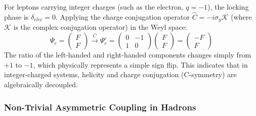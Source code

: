 \documentclass[12pt, a4paper]{article}
\begin{document}
For leptons carrying integer charges (such as the electron, $q = -1$), the locking phase is $\delta_{elec} = 0$. Applying the charge conjugation operator $\hat{C} = -i\sigma_y \mathcal{K}$ (where $\mathcal{K}$ is the complex conjugation operator) in the Weyl space:
\begin{equation}
\Psi_e = \begin{pmatrix} F \\ F \end{pmatrix} \xrightarrow{\hat{C}} \Psi_e^c = \begin{pmatrix} 0 & -1 \\ 1 & 0 \end{pmatrix} \begin{pmatrix} F \\ F \end{pmatrix} = \begin{pmatrix} -F \\ F \end{pmatrix} \label{eq:lepton_c_trans}
\end{equation}
The ratio of the left-handed and right-handed components changes simply from $+1$ to $-1$, which physically represents a simple sign flip. This indicates that in integer-charged systems, helicity and charge conjugation (C-symmetry) are algebraically decoupled.

\subsubsection{Non-Trivial Asymmetric Coupling in Hadrons}
\end{document}
